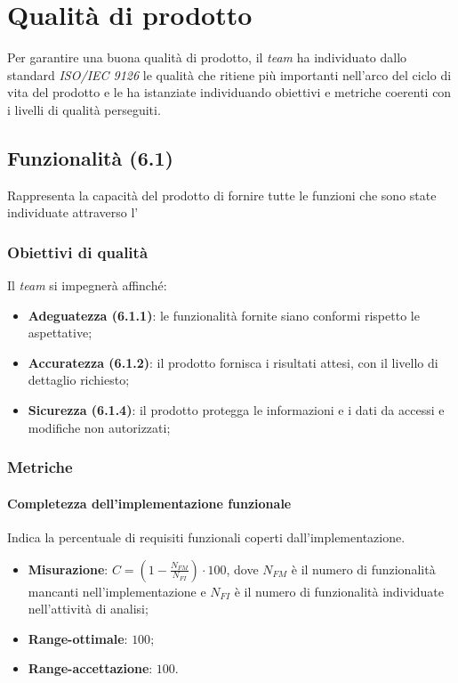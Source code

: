 \newpage
\section{Qualità di prodotto}
Per garantire una buona qualità di prodotto, il \textit{team} ha individuato dallo standard \textit{ISO/IEC 9126} le qualità che ritiene più importanti nell'arco del ciclo di vita del prodotto e le ha istanziate individuando obiettivi e metriche coerenti con i livelli di qualità perseguiti.

\subsection{Funzionalità (6.1)}
Rappresenta la capacità del prodotto di fornire tutte le funzioni che sono state individuate attraverso l'\textit{\AdR}
\subsubsection{Obiettivi di qualità}
Il \textit{team} si impegnerà affinché:
\begin{itemize}
\item \textbf{Adeguatezza (6.1.1)}: le funzionalità fornite siano conformi rispetto le aspettative;
\item \textbf{Accuratezza (6.1.2)}: il prodotto fornisca i risultati attesi, con il livello di dettaglio richiesto;
\item \textbf{Sicurezza (6.1.4)}: il prodotto protegga le informazioni e i dati da accessi e modifiche non autorizzati;
\end{itemize}
\subsubsection{Metriche}
\paragraph{Completezza dell'implementazione funzionale}
Indica la percentuale di requisiti funzionali coperti dall'implementazione.
\begin{itemize}
\item \textbf{Misurazione}: $C=(1-\frac{N_{FM}}{N_{FI}}) \cdot 100$, dove $N_{FM}$ è il numero di funzionalità mancanti nell'implementazione e $N_{FI}$ è il numero di funzionalità individuate nell'attività di analisi;
\item \textbf{Range-ottimale}: $100$;
\item \textbf{Range-accettazione}: $100$.
\end{itemize}
